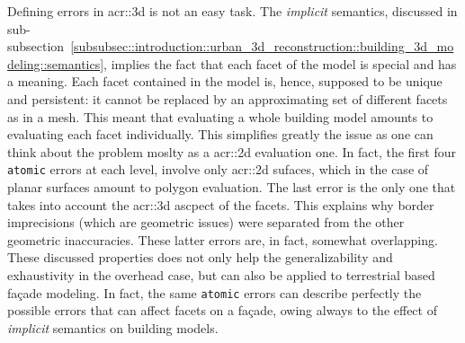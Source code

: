             \begin{figure}[htbp]
                \centering
            \end{figure}

            Defining errors in \gls{acr::3d} is not an easy task.
            The \textit{implicit} semantics, discussed in sub-subsection~\ref{subsubsec::introduction::urban_3d_reconstruction::building_3d_modeling::semantics}, implies the fact that each facet of the model is special and has a meaning.
            Each facet contained in the model is, hence, supposed to be unique and persistent: it cannot be replaced by an approximating set of different facets as in a mesh.
            This meant that evaluating a whole building model amounts to evaluating each facet individually.
            This simplifies greatly the issue as one can think about the problem moslty as a \gls{acr::2d} evaluation one.
            In fact, the first four \texttt{atomic} errors at each level, involve only \gls{acr::2d} sufaces, which in the case of planar surfaces amount to polygon evaluation.
            The last error is the only one that takes into account the \gls{acr::3d} ascpect of the facets.
            This explains why border imprecisions (which are geometric issues) were separated from the other geometric inaccuracies.
            These latter errors are, in fact, somewhat overlapping.
            These discussed properties does not only help the generalizability and exhaustivity in the overhead case, but can also be applied to terrestrial based fa\c{c}ade modeling.
            In fact, the same \texttt{atomic} errors can describe perfectly the possible errors that can affect facets on a fa\c{c}ade, owing always to the effect of \textit{implicit} semantics on building models.
        
